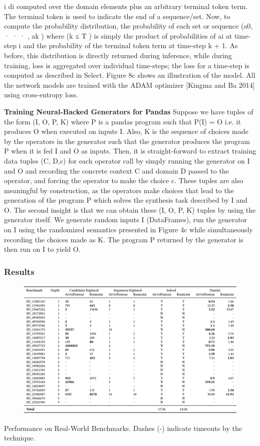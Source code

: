 \documentclass{article}
\begin{document}
i di
computed over the domain elements plus an arbitrary terminal token term. The terminal token
is used to indicate the end of a sequence/set. Now, to compute the probability distribution, the probability of each set or sequence (a0, · · · , ak ) where (k ≤ T ) is simply the product of probabilities of ai at time-step i and the probability of the terminal token term at time-step k + 1. As before, this distribution is directly returned during inference, while during training, loss is aggregated over individual time-steps; the loss for a time-step is computed as described in Select. Figure 8c shows an illustration of the model.
All the network models are trained with the ADAM optimizer [Kingma and Ba 2014] using cross-entropy loss.

\textbf{Training Neural-Backed Generators for Pandas} Suppose we have tuples of the form (I, O, P, K) where P is a pandas program such that P(I) = O i.e. it produces O when executed on inputs I. Also, K is the sequence of choices made by the operators in the generator such that the generator produces the program P when it is fed I and O as inputs. Then, it is straight-forward to extract training data tuples (C, D,c) for each operator call by simply running the generator on I and O and recording the concrete context C and domain D passed to the operator, and forcing the operator to make the choice c. These tuples are also meaningful by construction, as the operators make choices that lead to the generation of the program P which solves the synthesis task described by I and O.
The second insight is that we can obtain these (I, O, P, K) tuples by using the generator itself. We generate random inputs I (DataFrames), run the generator on I using the randomized semantics presented in Figure 4c while simultaneously recording the choices made as K. The program P returned by the generator is then run on I to yield O.

\subsubsection{Results}
\begin{figure}[ht]
\vskip 0.2in
\begin{center}
\centerline{\includegraphics[width=\columnwidth]{Images/Synthesis3-3.png}}
\label{icml-historical}
\end{center}
\vskip -0.2in
\end{figure}
Performance on Real-World Benchmarks. Dashes (-) indicate timeouts by the technique.
\end{document}
